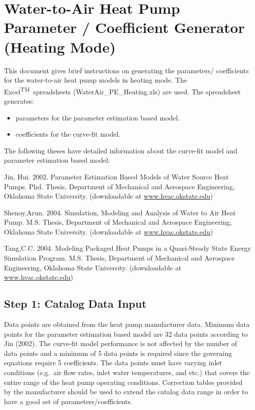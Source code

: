 \section{Water-to-Air Heat Pump Parameter / Coefficient Generator (Heating Mode)}\label{water-to-air-heat-pump-parameter-coefficient-generator-heating-mode}

This document gives brief instructions on generating the parameters/ coefficients for the water-to-air heat pump models in heating mode. The Excel\textsuperscript{TM}\ spreadsheets (WaterAir\_PE\_Heating.xls) are used. The spreadsheet generates:

\begin{itemize}
\item
  parameters for the parameter estimation based model.
\item
  coefficients for the curve-fit model.
\end{itemize}

The following theses have detailed information about the curve-fit model and parameter estimation based model:

Jin, Hui. 2002. Parameter Estimation Based Models of Water Source Heat Pumps. Phd. Thesis, Department of Mechanical and Aerospace Engineering, Oklahoma State University. (downloadable at \href{http://www.hvac.okstate.edu}{www.hvac.okstate.edu})

Shenoy,Arun. 2004. Simulation, Modeling and Analysis of Water to Air Heat Pump. M.S. Thesis, Department of Mechanical and Aerospace Engineering, Oklahoma State University. (downloadable at \href{http://www.hvac.okstate.edu}{www.hvac.okstate.edu})

Tang,C.C. 2004. Modeling Packaged Heat Pumps in a Quasi-Steady State Energy Simulation Program. M.S. Thesis, Department of Mechanical and Aerospace Engineering, Oklahoma State University. (downloadable at \href{http://www.hvac.okstate.edu}{www.hvac.okstate.edu})

\subsection{Step 1: Catalog Data Input}\label{step-1-catalog-data-input}

Data points are obtained from the heat pump manufacturer data. Minimum data points for the parameter estimation based model are 32 data points according to Jin (2002). The curve-fit model performance is not affected by the number of data points and a minimum of 5 data points is required since the governing equations require 5 coefficients. The data points must have varying inlet conditions (e.g.~air flow rates, inlet water temperatures, and etc.) that covers the entire range of the heat pump operating conditions. Correction tables provided by the manufacturer should be used to extend the catalog data range in order to have a good set of parameters/coefficients.

